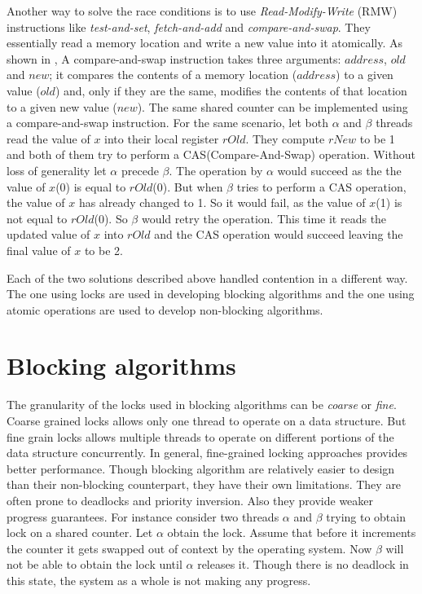 Another way to solve the race conditions is to use \emph{Read-Modify-Write} (RMW) instructions like \emph{test-and-set}, \emph{fetch-and-add} and \emph{compare-and-swap}. They essentially read a memory location and write a new value into it atomically. As shown in , A compare-and-swap  instruction takes three arguments: $address$, $old$ and $new$; it compares the contents of a memory location ($address$) to a given value ($old$) and, only if they are the same, modifies the contents of that location to a given new value ($new$). The same shared counter can be implemented using a compare-and-swap instruction. For the same scenario, let both $\alpha$ and $\beta$ threads read the value of $x$ into their local register $rOld$. They compute $rNew$ to be 1 and both of them try to perform a CAS(Compare-And-Swap) operation. Without loss of generality let $\alpha$ precede $\beta$. The operation by $\alpha$ would succeed as the the value of $x$(0) is equal to $rOld$(0). But when $\beta$ tries to perform a CAS operation, the value of $x$ has already changed to 1. So it would fail, as the value of $x$(1) is not equal to $rOld$(0). So $\beta$ would retry the operation. This time it reads the updated value of $x$ into $rOld$ and the CAS operation would succeed leaving the final value of $x$ to be 2.

Each of the two solutions described above handled contention in a different way. The one using locks are used in developing blocking algorithms and the one using atomic operations are used to develop non-blocking algorithms.

\section{Blocking algorithms}
The granularity of the locks used in blocking algorithms can be \emph{coarse} or \emph{fine}. Coarse grained locks allows only one thread to operate on a data structure. But fine grain locks allows multiple threads to operate on different portions of the data structure concurrently. In general, fine-grained locking approaches provides better performance. Though blocking algorithm are relatively easier to design than their non-blocking counterpart, they have their own limitations. They are often prone to deadlocks and priority inversion. Also they provide weaker progress guarantees. For instance consider two threads $\alpha$ and $\beta$ trying to obtain lock on a shared counter. Let $\alpha$ obtain the lock. Assume that before it increments the counter it gets swapped out of context by the operating system. Now $\beta$ will not be able to obtain the lock until $\alpha$ releases it. Though there is no deadlock in this state, the system as a whole is not making any progress.

